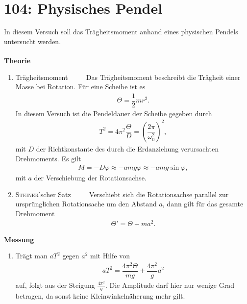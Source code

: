 \section{104: Physisches Pendel}
In diesem Versuch soll das Trägheitsmoment anhand eines physischen Pendels untersucht werden.\\\\
\textbf{Theorie} 
\begin{enumerate}[label=--]
        \item Trägheitsmoment $\qquad $ 
                Das Trägheitsmoment beschreibt die Trägheit einer Masse bei Rotation.
                Für eine Scheibe ist es
                \begin{align} 
                        \Theta =\dfrac{1}{2}mr^2
                .\end{align} 
                In diesem Versuch ist die Pendeldauer der Scheibe gegeben durch
                \begin{align} 
                        T^2=4\pi ^2\dfrac{\Theta }{D}=\left(\dfrac{2\pi }{\omega _0^2}\right)^2
                ,\end{align} 
                mit $D$ der Richtkonstante des durch die Erdanziehung verursachten Drehmoments. 
                Es gilt
                \begin{align} 
                        M=-D\varphi \approx -amg\varphi \approx -amg\sin \varphi 
                ,\end{align} 
                mit $a$ der Verschiebung der Rotationsachse. 
        \item \textsc{Steiner}'scher Satz $\qquad $ 
                Verschiebt sich die Rotationsachse parallel zur ursprünglichen Rotationsache um den Abstand $a$, dann gilt für das gesamte Drehmoment
                \begin{align} 
                        \Theta '=\Theta +ma^2
                .\end{align} 
\end{enumerate}
\textbf{Messung} 
\begin{enumerate}[label=--]
        \item Trägt man $aT^2$ gegen $a^2$ mit Hilfe von
                \begin{align} 
                        aT^2=\dfrac{4\pi ^2\Theta }{mg}+\dfrac{4\pi ^2}{g}a^2
                \end{align} 
                auf, folgt aus der Steigung $\tfrac{4\pi ^2}{g}$.
                Die Amplitude darf hier nur wenige Grad betragen, da sonst keine Kleinwinkelnäherung mehr gilt.
\end{enumerate}

